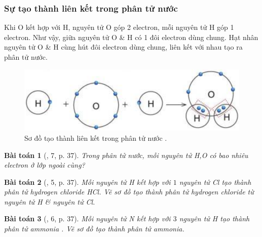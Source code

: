 \documentclass{article}
\newtheorem{baitoan}{Bài toán}
\begin{document}
\subsubsection{Sự tạo thành liên kết trong phân tử nước }
Khi O kết hợp với H, nguyên tử O góp 2 electron, mỗi nguyên tử H góp 1 electron. Như vậy, giữa nguyên tử O \& H có 1 đôi electron dùng chung. Hạt nhân nguyên tử O \& H cùng hút đôi electron dùng chung, liên kết với nhau tạo ra phân tử nước.
\begin{figure}[H]
	\centering
	\includegraphics[scale=0.3]{H2O}
	\caption{Sơ đồ tạo thành liên kết trong phân tử nước .}
\end{figure}

\begin{baitoan}[\cite{SGK_KHTN_7_Canh_Dieu}, 7, p. 37]
	Trong phân tử nước, mỗi nguyên tử \emph{H,O} có bao nhiêu electron ở lớp ngoài cùng?
\end{baitoan}

\begin{baitoan}[\cite{SGK_KHTN_7_Canh_Dieu}, 5, p. 37]
	Mỗi nguyên tử \emph{H} kết hợp với $1$ nguyên tử \emph{Cl} tạo thành phân tử hydrogen chloride \emph{HCl}. Vẽ sơ đồ tạo thành phân tử hydrogen chloride từ nguyên tử \emph{H} \& nguyên tử \emph{Cl}.
\end{baitoan}

\begin{baitoan}[\cite{SGK_KHTN_7_Canh_Dieu}, 6, p. 37]
	Mỗi nguyên tử \emph{N} kết hợp với $3$ nguyên tử \emph{H} tạo thành phân tử ammonia \emph{}. Vẽ sơ đồ tạo thành phân tử ammonia.
\end{baitoan}
\end{document}
